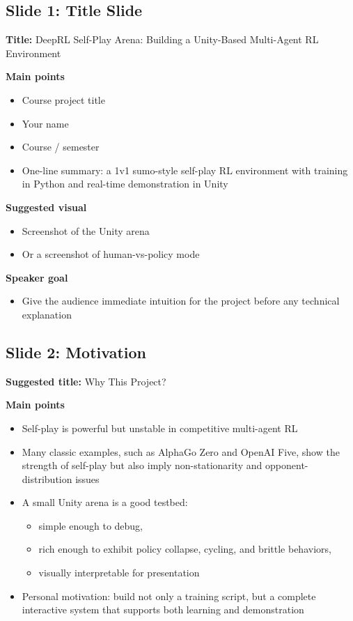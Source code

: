 \documentclass[11pt]{article}
\begin{document}
\subsection*{Slide 1: Title Slide}

\textbf{Title:} DeepRL Self-Play Arena: Building a Unity-Based Multi-Agent RL Environment

\textbf{Main points}
\begin{itemize}
    \item Course project title
    \item Your name
    \item Course / semester
    \item One-line summary: a 1v1 sumo-style self-play RL environment with training in Python and real-time demonstration in Unity
\end{itemize}

\textbf{Suggested visual}
\begin{itemize}
    \item Screenshot of the Unity arena
    \item Or a screenshot of human-vs-policy mode
\end{itemize}

\textbf{Speaker goal}
\begin{itemize}
    \item Give the audience immediate intuition for the project before any technical explanation
\end{itemize}

\subsection*{Slide 2: Motivation}

\textbf{Suggested title:} Why This Project?

\textbf{Main points}
\begin{itemize}
    \item Self-play is powerful but unstable in competitive multi-agent RL
    \item Many classic examples, such as AlphaGo Zero and OpenAI Five, show the strength of self-play but also imply non-stationarity and opponent-distribution issues
    \item A small Unity arena is a good testbed:
    \begin{itemize}
        \item simple enough to debug,
        \item rich enough to exhibit policy collapse, cycling, and brittle behaviors,
        \item visually interpretable for presentation
    \end{itemize}
    \item Personal motivation: build not only a training script, but a complete interactive system that supports both learning and demonstration
\end{itemize}
\end{document}
